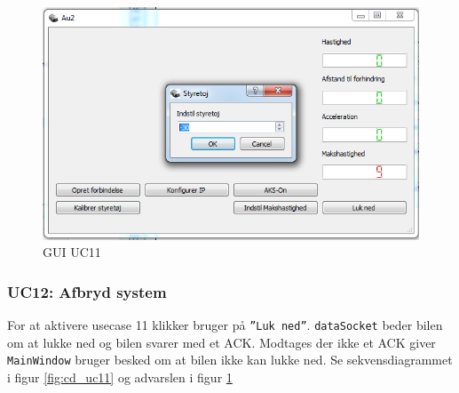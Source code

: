 \begin{figure}[H]
\centering
\includegraphics[width=\textwidth* 3/4,height=\textwidth* 9/20 ]{../fig/billeder/gui_uc11.png}
\caption{GUI UC11}
\label{fig:GUI_uc11}
\end{figure}

\clearpage

\subsubsection{UC12: Afbryd system}
For at aktivere usecase 11 klikker bruger på \texttt{''Luk ned''}.
\texttt{dataSocket} beder bilen om at lukke ned og bilen svarer med et ACK. Modtages der ikke et ACK giver \texttt{MainWindow} bruger besked om at bilen ikke kan lukke ned. Se sekvensdiagrammet i figur \ref{fig:cd_uc11} og advarslen i figur \ref{fig:GUI_uc11}


